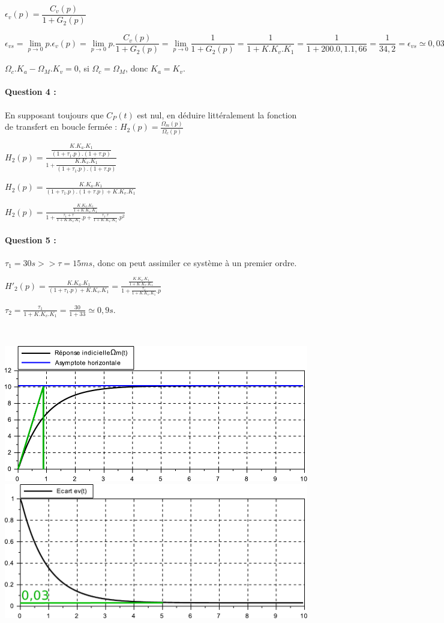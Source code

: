 $\epsilon_v(p)=\dfrac{C_v(p)}{1+G_2(p)}$

$\epsilon_{vs}=\lim\limits_{p \rightarrow 0} p.\epsilon_v(p)=\lim\limits_{p \rightarrow 0} p.\dfrac{C_v(p)}{1+G_2(p)}=\lim\limits_{p \rightarrow 0} \dfrac{1}{1+G_2(p)}=\dfrac{1}{1+K.K_v.K_1}=\dfrac{1}{1+200.0,1.1,66}=\dfrac{1}{34,2}=\epsilon_{vs}\simeq0,03$

$\Omega_c.K_a-\Omega_M.K_v=0$, si $\Omega_c=\Omega_M$, donc $K_a=K_v$.

\paragraph{Question 4 :} En supposant toujours que $C_P(t)$ est nul, en déduire littéralement la fonction de transfert en boucle fermée : $H_2(p)=\frac{\Omega_m(p)}{\Omega_c(p)}$	

$H_2(p)=\frac{\dfrac{K.K_a.K_1}{(1+\tau_1.p).(1+\tau.p)}}{1+\dfrac{K.K_v.K_1}{(1+\tau_1.p).(1+\tau.p)}}$

$H_2(p)=\frac{K.K_a.K_1}{(1+\tau_1.p).(1+\tau.p)+K.K_v.K_1}$

$H_2(p)=\frac{\frac{K.K_a.K_1}{1+K.K_v.K_1}}{1+\frac{\tau_1+\tau}{1+K.K_v.K_1}.p+\frac{\tau_1.\tau}{1+K.K_v.K_1}.p^2}$

\paragraph{Question 5 :} 

$\tau_1=30s >> \tau=15ms$, donc on peut assimiler ce système à un premier ordre.

$H'_2(p)=\frac{K.K_a.K_1}{(1+\tau_1.p)+K.K_v.K_1}=\frac{\frac{K.K_a.K_1}{1+K.K_v.K_1}}{1+\frac{\tau_1}{1+K.K_v.K_1}.p}$

$\tau_2=\frac{\tau_1}{1+K.K_v.K_1}=\frac{30}{1+33}\simeq0,9s.$

~\

\begin{center}
\includegraphics[width=0.7\linewidth]{img/motoreduc_courbe1_cor} \\
\includegraphics[width=0.7\linewidth]{img/motoreduc_courbe2_cor}
\end{center}

